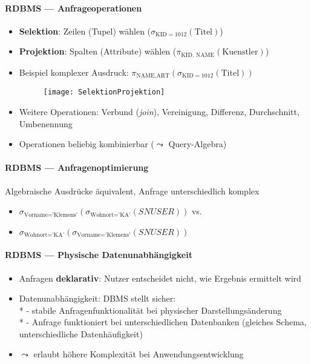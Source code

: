 \paragraph{RDBMS --- Anfrageoperationen}
\begin{itemize}
  \item \textbf{Selektion}: Zeilen (Tupel) wählen (\( \sigma_{\text{KID}=1012}(\text{Titel}) \))
  \item \textbf{Projektion}: Spalten (Attribute) wählen (\( \pi_{\text{KID, NAME}}(\text{Kuenstler}) \))
  \item Beispiel komplexer Ausdruck: \( \pi_{\text{NAME}, \text{ART}}(\sigma_{\text{KID}=1012}(\text{Titel})) \)
  \begin{figure}[H]\centering\label{SelektionProjektion}\texttt{[image: SelektionProjektion]}\end{figure}
  \item Weitere Operationen: Verbund (\emph{join}), Vereinigung, Differenz, Durchschnitt, Umbenennung
  \item Operationen beliebig kombinierbar (\( \leadsto \) Query-Algebra)
\end{itemize}

\paragraph{RDBMS --- Anfragenoptimierung}
Algebraische Ausdrücke äquivalent, Anfrage unterschiedlich komplex
\begin{itemize}
  \item \( \sigma_{\text{Vorname} = \text{'Klemens'}}(\sigma_{\text{Wohnort} = \text{'KA'}}(SNUSER)) \) vs.
  \item \( \sigma_{\text{Wohnort} = \text{'KA'}}(\sigma_{\text{Vorname} = \text{'Klemens'}}(SNUSER)) \)
\end{itemize}

\paragraph{RDBMS --- Physische Datenunabhängigkeit}
\begin{itemize}
  \item Anfragen \textbf{deklarativ}: Nutzer entscheidet nicht, wie Ergebnis ermittelt wird
  \item Datenunabhängigkeit: DBMS stellt sicher: \\*
    - stabile Anfragenfunktionalität bei physischer Darstellungsänderung \\*
    - Anfrage funktioniert bei unterschiedlichen Datenbanken (gleiches Schema, unterschiedliche Datenhäufigkeit)
  \item \( \leadsto \) erlaubt höhere Komplexität bei Anwendungsentwicklung
\end{itemize}

